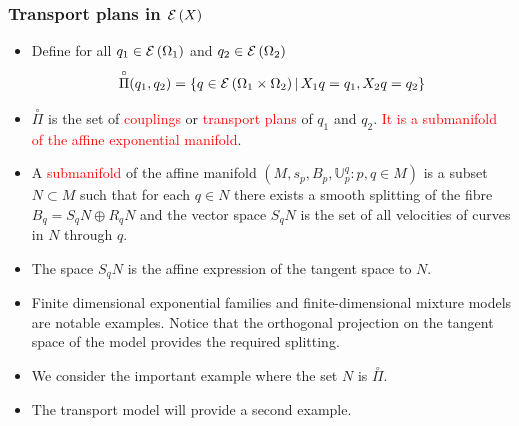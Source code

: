 \documentclass[xcolor=svgnames]{beamer}
\newcommand{\eBspace}[1]{B_{#1}}
\newcommand{\rosso}[1]{\textcolor{red}{#1}}
\renewcommand{\emph}{\rosso}
\renewcommand{\transport}[2]{{\mathbb U} _ {#1} ^ {#2}}
\begin{document}
\begin{frame}\small\frametitle{Transport plans in $\operatorname{\mathcal E}\left(X\right)$}
 \begin{itemize}
 
     \item Define for all $q_1 \in \operatorname{\mathcal E}\left(\Omega_1\right)$ and $q_2 \in \operatorname{\mathcal E}\left(\Omega_2\right)$
     \begin{equation*}
         \overset{\circ}{\Pi}(q_1,q_2) = \left\{q \in \operatorname{\mathcal E}\left(\Omega_1 \times \Omega_2\right) \, \middle| \, X_1 q = q_1,X_2 q= q_2 \right\}
     \end{equation*}
 
 \item  $\overset{\circ}{\Pi}$ is the set of \emph{couplings} or \emph{transport plans} of $q_1$ and $q_2$. \emph{It is a submanifold of the affine exponential manifold}.
 
     \item A \emph{submanifold} of the affine manifold $(M,s_p,\eBspace p,\transport p q \colon p,q \in M)$ is a subset $N \subset M$ such that for each $q \in N$ there exists a smooth splitting of the fibre $\eBspace q = S_q N \oplus R_q N$ and the vector space $S_q N$ is the set of all velocities of curves in $N$ through $q$. 

\item The space $S_qN$ is the affine expression of the tangent space to $N$.

 \item Finite dimensional exponential families and finite-dimensional mixture models are notable examples. Notice that the orthogonal projection on the tangent space of the model provides the required splitting.

\item We consider the important example where the set $N$ is $\overset{\circ}{\Pi}$.

   
    \item The transport model will provide a second example.    

\end{itemize}
\end{frame}
\end{document}
